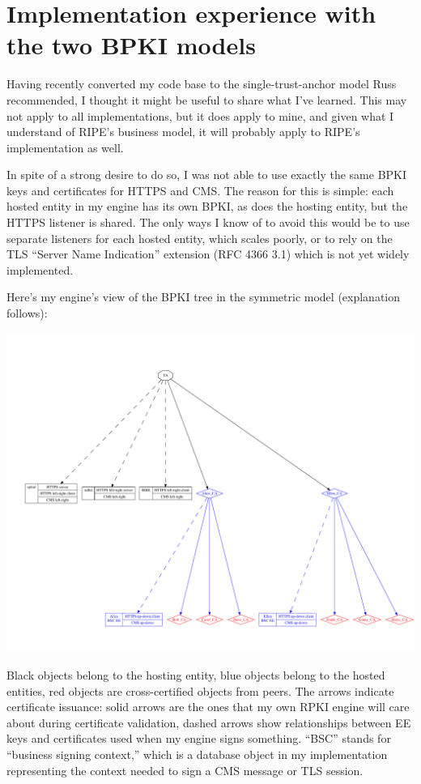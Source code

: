 \documentclass[11pt]{article}
\begin{document}
\section*{Implementation experience with the two BPKI models}

Having recently converted my code base to the single-trust-anchor
model Russ recommended, I thought it might be useful to share what
I've learned.  This may not apply to all implementations, but it does
apply to mine, and given what I understand of RIPE's business model,
it will probably apply to RIPE's implementation as well.

In spite of a strong desire to do so, I was not able to use exactly
the same BPKI keys and certificates for HTTPS and CMS.  The reason for
this is simple: each hosted entity in my engine has its own BPKI, as
does the hosting entity, but the HTTPS listener is shared.  The only
ways I know of to avoid this would be to use separate listeners for
each hosted entity, which scales poorly, or to rely on the TLS
``Server Name Indication'' extension (RFC 4366 3.1) which is not yet
widely implemented.

Here's my engine's view of the BPKI tree in the symmetric model
(explanation follows):

\begin{center}
\includegraphics[width = 6.5in]{bpki-symmetric}
\end{center}

Black objects belong to the hosting entity, blue objects belong to the
hosted entities, red objects are cross-certified objects from peers.
The arrows indicate certificate issuance: solid arrows are the ones
that my own RPKI engine will care about during certificate validation,
dashed arrows show relationships between EE keys and certificates used
when my engine signs something.  ``BSC'' stands for ``business signing
context,'' which is a database object in my implementation
representing the context needed to sign a CMS message or TLS session.
\end{document}
